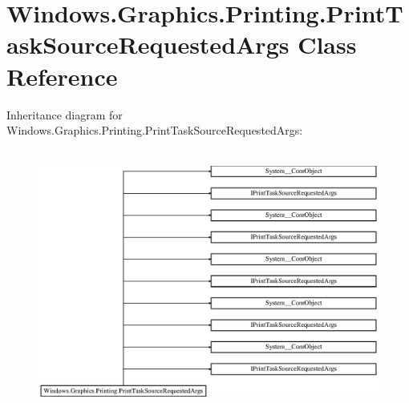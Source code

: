 \hypertarget{class_windows_1_1_graphics_1_1_printing_1_1_print_task_source_requested_args}{}\section{Windows.\+Graphics.\+Printing.\+Print\+Task\+Source\+Requested\+Args Class Reference}
\label{class_windows_1_1_graphics_1_1_printing_1_1_print_task_source_requested_args}
Inheritance diagram for Windows.\+Graphics.\+Printing.\+Print\+Task\+Source\+Requested\+Args\+:\begin{figure}[H]
\begin{center}
\leavevmode
\includegraphics[height=8.700564cm]{class_windows_1_1_graphics_1_1_printing_1_1_print_task_source_requested_args}
\end{center}
\end{figure}
